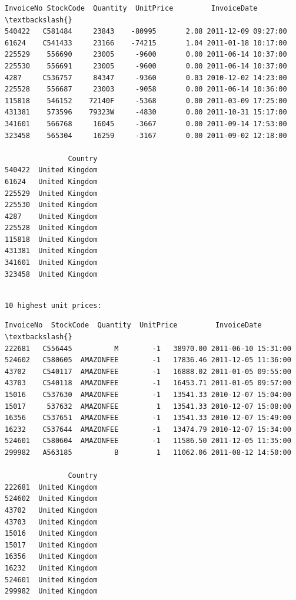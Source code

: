\documentclass[11pt]{article}
\begin{document}
    
    \begin{Verbatim}[commandchars=\\\{\}]
       InvoiceNo StockCode  Quantity  UnitPrice         InvoiceDate  \textbackslash{}
540422   C581484     23843    -80995       2.08 2011-12-09 09:27:00   
61624    C541433     23166    -74215       1.04 2011-01-18 10:17:00   
225529    556690     23005     -9600       0.00 2011-06-14 10:37:00   
225530    556691     23005     -9600       0.00 2011-06-14 10:37:00   
4287     C536757     84347     -9360       0.03 2010-12-02 14:23:00   
225528    556687     23003     -9058       0.00 2011-06-14 10:36:00   
115818    546152    72140F     -5368       0.00 2011-03-09 17:25:00   
431381    573596    79323W     -4830       0.00 2011-10-31 15:17:00   
341601    566768     16045     -3667       0.00 2011-09-14 17:53:00   
323458    565304     16259     -3167       0.00 2011-09-02 12:18:00   

               Country  
540422  United Kingdom  
61624   United Kingdom  
225529  United Kingdom  
225530  United Kingdom  
4287    United Kingdom  
225528  United Kingdom  
115818  United Kingdom  
431381  United Kingdom  
341601  United Kingdom  
323458  United Kingdom  
    \end{Verbatim}

    
    \begin{Verbatim}[commandchars=\\\{\}]

10 highest unit prices:
    \end{Verbatim}

    
    \begin{Verbatim}[commandchars=\\\{\}]
       InvoiceNo  StockCode  Quantity  UnitPrice         InvoiceDate  \textbackslash{}
222681   C556445          M        -1   38970.00 2011-06-10 15:31:00   
524602   C580605  AMAZONFEE        -1   17836.46 2011-12-05 11:36:00   
43702    C540117  AMAZONFEE        -1   16888.02 2011-01-05 09:55:00   
43703    C540118  AMAZONFEE        -1   16453.71 2011-01-05 09:57:00   
15016    C537630  AMAZONFEE        -1   13541.33 2010-12-07 15:04:00   
15017     537632  AMAZONFEE         1   13541.33 2010-12-07 15:08:00   
16356    C537651  AMAZONFEE        -1   13541.33 2010-12-07 15:49:00   
16232    C537644  AMAZONFEE        -1   13474.79 2010-12-07 15:34:00   
524601   C580604  AMAZONFEE        -1   11586.50 2011-12-05 11:35:00   
299982   A563185          B         1   11062.06 2011-08-12 14:50:00   

               Country  
222681  United Kingdom  
524602  United Kingdom  
43702   United Kingdom  
43703   United Kingdom  
15016   United Kingdom  
15017   United Kingdom  
16356   United Kingdom  
16232   United Kingdom  
524601  United Kingdom  
299982  United Kingdom  
    \end{Verbatim}
\end{document}
